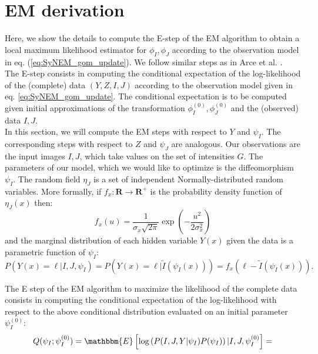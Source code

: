 \appendix
\section{EM derivation}
Here, we show the details to compute the E-step of the EM algorithm \cite{Dempster1977} to obtain a local maximum likelihood estimator for $\phi_{I}, \phi_{J}$
according to the observation model in eq. (\ref{eq:SyNEM_gom_update}). We follow similar steps as in Arce et al. \cite{Arce-santana2014}.\\

The E-step \cite{Dempster1977} consists in computing the conditional expectation of the log-likelihood of the (complete) data $(Y, Z, I, J)$ according to the observation model given
in eq. \ref{eq:SyNEM_gom_update}. The conditional expectation is to be computed given initial approximations of the transformation $\phi_{I}^{(0)}, \phi_{J}^{(0)}$ and the (observed)
data $I, J$.\\

In this section, we will compute the EM steps with respect to $Y$ and $\psi_{I}$. The corresponding steps with respect to $Z$ and $\psi_{J}$ are analogous. Our observations are
the input images $I, J$, which take values on the set of intensities $G$. The parameters of our model, which we would like to optimize is the diffeomorphism $\psi_{I}$.
The random field $\eta_{J}$ is a set of independent Normally-distributed random variables. More formally, if $f_{x}:\mathbf{R}\rightarrow \mathbf{R}^{+}$ is the probability density
function of $\eta_{J}(x)$ then:
\begin{equation}
    f_{x}(u) = \frac{1}{\sigma_{x}\sqrt{2 \pi}}\exp\left(-\frac{u^{2}}{2\sigma_{x}^{2}}\right)
\end{equation}
and the marginal distribution of each hidden variable $Y(x)$ given the data is a parametric function of $\psi_I$:
\begin{equation}
    P(Y(x) = \ell | I, J, \psi_{I}) = P(Y(x) = \ell | \tilde{I}(\psi_I(x))) = f_{x}(\ell - \tilde{I}(\psi_I(x))).
\end{equation}

The E step of the EM algorithm to maximize the likelihood of the complete data consists in computing the conditional expectation of the log-likelihood
with respect to the above conditional distribution evaluated on an initial parameter $\psi_{I}^{(0)}$:
\begin{equation}
    Q(\psi_{I}; \psi_{I}^{(0)}) = \mathbbm{E}\left[ \log \left(P(I, J, Y|\psi_{I})P(\psi_{I})\right) | I, J, \psi_{I}^{(0)}\right] =
\end{equation}

